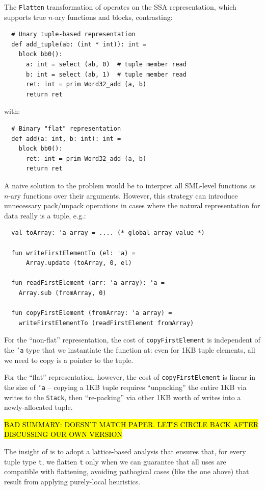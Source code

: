 \documentclass[leqno,11pt]{article}
\begin{document}
The \texttt{Flatten} transformation of \cite{flat-paper} operates on the SSA
representation, which supports true $n$-ary functions and blocks, contrasting:
\begin{verbatim}
  # Unary tuple-based representation
  def add_tuple(ab: (int * int)): int =
    block bb0():
      a: int = select (ab, 0)  # tuple member read
      b: int = select (ab, 1)  # tuple member read
      ret: int = prim Word32_add (a, b)
      return ret
\end{verbatim}
with:
\begin{verbatim}
  # Binary "flat" representation
  def add(a: int, b: int): int =
    block bb0():
      ret: int = prim Word32_add (a, b)
      return ret
\end{verbatim}

A naive solution to the problem would be to interpret all SML-level functions as
$n$-ary functions over their arguments. However, this strategy can introduce
unnecessary pack/unpack operations in cases where the natural representation for
data really is a tuple, e.g.:
\begin{verbatim}
  val toArray: 'a array = .... (* global array value *)

  fun writeFirstElementTo (el: 'a) =
      Array.update (toArray, 0, el)

  fun readFirstElement (arr: 'a array): 'a =
    Array.sub (fromArray, 0)

  fun copyFirstElement (fromArray: 'a array) =
    writeFirstElementTo (readFirstElement fromArray)
\end{verbatim}
For the ``non-flat'' representation, the cost of \texttt{copyFirstElement} is
independent of the \texttt{'a} type that we instantiate the function at: even
for 1KB tuple elements, all we need to copy is a pointer to the tuple.

For the ``flat'' representation, however, the cost of \texttt{copyFirstElement}
is linear in the size of \texttt{'a} -- copying a 1KB tuple requires
``unpacking'' the entire 1KB via writes to the \texttt{Stack}, then
``re-packing'' via other 1KB worth of writes into a newly-allocated tuple.

\hl{BAD SUMMARY: DOESN'T MATCH PAPER. LET'S CIRCLE BACK AFTER DISCUSSING OUR OWN
  VERSION}

The insight of \cite{flat-paper} is to adopt a lattice-based analysis that
ensures that, for every tuple type \texttt{t}, we flatten \texttt{t} only when
we can guarantee that all uses are compatible with flattening, avoiding
pathogical cases (like the one above) that result from applying purely-local
heuristics.
\end{document}
